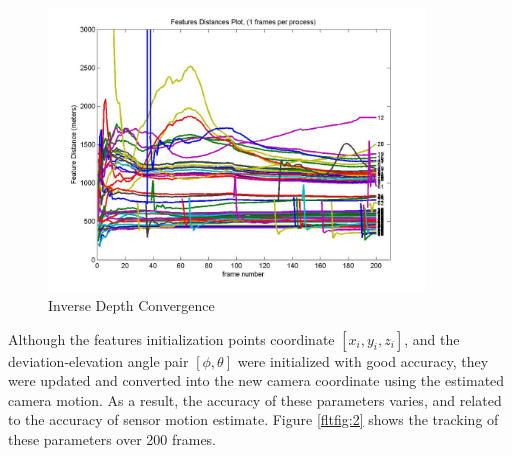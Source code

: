 \begin{figure}[h]
\centering
\includegraphics[width=10cm, keepaspectratio=true]{./Figures/fltfig/d-plot-1fpp-200f2p.jpg}
\caption{Inverse Depth Convergence}
\label{fltfig:1}
\end{figure}

Although the features initialization points coordinate $[x_i, y_i,
z_i]$, and the deviation-elevation angle pair $[\phi, \theta]$ were
initialized with good accuracy, they were updated and converted into
the new camera coordinate using the estimated camera motion. As a
result, the accuracy of these parameters varies, and related to the
accuracy of sensor motion estimate. Figure \ref{fltfig:2} shows the
tracking of these parameters over 200 frames. 
 
